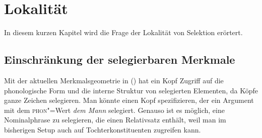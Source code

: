 
\chapter{Lokalität}
\label{chap-lokalitaet}


In diesem kurzen Kapitel wird die Frage der Lokalität von Selektion erörtert.

\section{Einschränkung der selegierbaren Merkmale}
\label{sec-synsem}

Mit der aktuellen Merkmalsgeometrie in () hat ein Kopf Zugriff auf die phonologische Form und 
die interne Struktur von selegierten Elementen, da Köpfe ganze Zeichen selegieren.
\ea
{}
\z
Man könnte \zb einen Kopf spezifizieren, der ein Argument mit dem \textsc{phon}"=Wert {\em dem Mann\/} selegiert. Genauso ist es möglich,
eine Nominalphrase zu selegieren, die einen Relativsatz enthält, weil man im
bisherigen Setup auch auf Tochterkonstituenten zugreifen kann.

